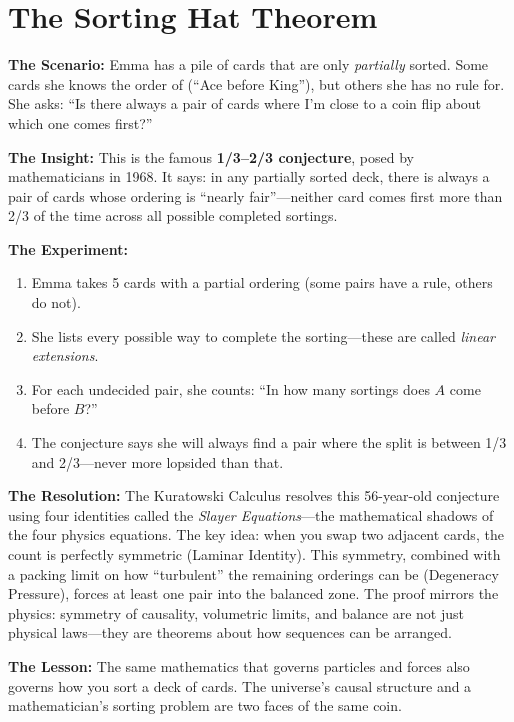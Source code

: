 \documentclass[11pt, a4paper, openany]{book}
\begin{document}
\section{The Sorting Hat Theorem}
\begin{thoughtexp}
\textbf{The Scenario:} Emma has a pile of cards that are only \emph{partially} sorted. Some cards she knows the order of (``Ace before King''), but others she has no rule for. She asks: ``Is there always a pair of cards where I'm close to a coin flip about which one comes first?''

\textbf{The Insight:} This is the famous \textbf{1/3--2/3 conjecture}, posed by mathematicians in 1968. It says: in any partially sorted deck, there is always a pair of cards whose ordering is ``nearly fair''---neither card comes first more than 2/3 of the time across all possible completed sortings.

\textbf{The Experiment:}
\begin{enumerate}
  \item Emma takes 5 cards with a partial ordering (some pairs have a rule, others do not).
  \item She lists every possible way to complete the sorting---these are called \emph{linear extensions}.
  \item For each undecided pair, she counts: ``In how many sortings does $A$ come before $B$?''
  \item The conjecture says she will always find a pair where the split is between 1/3 and 2/3---never more lopsided than that.
\end{enumerate}

\textbf{The Resolution:} The Kuratowski Calculus resolves this 56-year-old conjecture using four identities called the \emph{Slayer Equations}---the mathematical shadows of the four physics equations. The key idea: when you swap two adjacent cards, the count is perfectly symmetric (Laminar Identity). This symmetry, combined with a packing limit on how ``turbulent'' the remaining orderings can be (Degeneracy Pressure), forces at least one pair into the balanced zone. The proof mirrors the physics: symmetry of causality, volumetric limits, and balance are not just physical laws---they are theorems about how sequences can be arranged.

\textbf{The Lesson:} The same mathematics that governs particles and forces also governs how you sort a deck of cards. The universe's causal structure and a mathematician's sorting problem are two faces of the same coin.
\end{thoughtexp}
\end{document}
